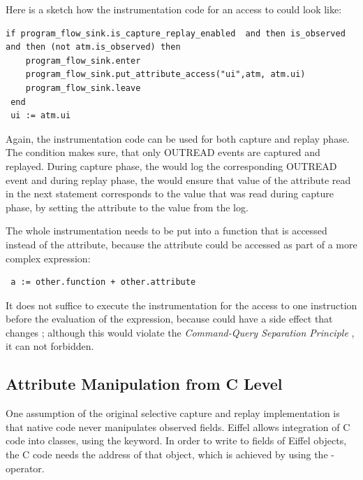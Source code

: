 Here is a sketch how the instrumentation code for an access to  could look like:
\begin{lstlisting}[caption=Instrumentation of an Attribute Access]
 if program_flow_sink.is_capture_replay_enabled  and then is_observed and then (not atm.is_observed) then
	program_flow_sink.enter
	program_flow_sink.put_attribute_access("ui",atm, atm.ui)
	program_flow_sink.leave
 end
 ui := atm.ui
\end{lstlisting}
Again, the instrumentation code can be used for both capture and replay phase. The condition makes sure, that only OUTREAD events are captured and replayed. During capture phase, the  would log the corresponding OUTREAD event and during replay phase, the  would ensure that value of the attribute read in the next statement corresponds to the value that was read during capture phase, by setting the attribute to the value from the log.

The whole instrumentation needs to be put into a function that is accessed instead of the attribute, because the attribute could be accessed as part of a more complex expression:
\begin{lstlisting}
 a := other.function + other.attribute
\end{lstlisting}
It does not suffice to execute the instrumentation for the access to  one instruction before the evaluation of the expression, because  could have a side effect that changes ; although this would violate the \emph{Command-Query Separation Principle} \cite{oosc2}, it can not forbidden.


\subsection{Attribute Manipulation from C Level}
One assumption of the original selective capture and replay implementation is that native code never manipulates observed fields. Eiffel allows integration of C code into classes, using the  keyword. In order to write to fields of Eiffel objects, the C code needs the address of that object, which is achieved by using the \identifier{\$} - operator.

